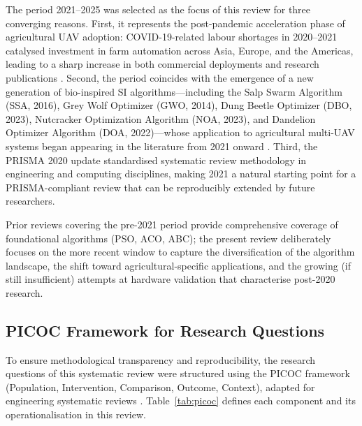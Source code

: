\documentclass[review,3p,times]{elsarticle}
\begin{document}
The period 2021--2025 was selected as the focus of this review for three converging reasons. First, it represents the post-pandemic acceleration phase of agricultural UAV adoption: COVID-19-related labour shortages in 2020--2021 catalysed investment in farm automation across Asia, Europe, and the Americas, leading to a sharp increase in both commercial deployments and research publications \cite{tsouros2019,mogili2018}. Second, the period coincides with the emergence of a new generation of bio-inspired SI algorithms---including the Salp Swarm Algorithm (SSA, 2016), Grey Wolf Optimizer (GWO, 2014), Dung Beetle Optimizer (DBO, 2023), Nutcracker Optimization Algorithm (NOA, 2023), and Dandelion Optimizer Algorithm (DOA, 2022)---whose application to agricultural multi-UAV systems began appearing in the literature from 2021 onward \cite{li2023,xiao2025}. Third, the PRISMA 2020 update \cite{page2021} standardised systematic review methodology in engineering and computing disciplines, making 2021 a natural starting point for a PRISMA-compliant review that can be reproducibly extended by future researchers.

Prior reviews covering the pre-2021 period \cite{chung2018,puente2022,sharma2022,aitsaadi2022} provide comprehensive coverage of foundational algorithms (PSO, ACO, ABC); the present review deliberately focuses on the more recent window to capture the diversification of the algorithm landscape, the shift toward agricultural-specific applications, and the growing (if still insufficient) attempts at hardware validation that characterise post-2020 research.

\subsection{PICOC Framework for Research Questions}
\label{subsec:picoc}

To ensure methodological transparency and reproducibility, the research questions of this systematic review were structured using the PICOC framework (Population, Intervention, Comparison, Outcome, Context), adapted for engineering systematic reviews \cite{brambilla2013,bayindir2016}. Table~\ref{tab:picoc} defines each component and its operationalisation in this review.
\end{document}
